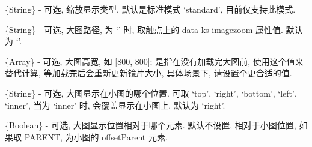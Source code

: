 \documentclass[letterpaper,10pt,english]{sphinxmanual}
\begin{document}
\begin{fulllineitems}
\label{api/component/imagezoom/index:ImageZoom.type}
\{String\} - 可选, 缩放显示类型, 默认是标准模式 `standard', 目前仅支持此模式.

\end{fulllineitems}



\begin{fulllineitems}
\label{api/component/imagezoom/index:ImageZoom.bigImageSrc}
\{String\} - 可选, 大图路径, 为 `' 时, 取触点上的 data-ks-imagezoom 属性值. 默认为 `'.

\end{fulllineitems}



\begin{fulllineitems}
\label{api/component/imagezoom/index:ImageZoom.bigImageSize}
\{Array\} - 可选, 大图高宽, 如 {[}800, 800{]}; 是指在没有加载完大图前, 使用这个值来替代计算, 等加载完后会重新更新镜片大小, 具体场景下, 请设置个更合适的值.

\end{fulllineitems}



\begin{fulllineitems}
\label{api/component/imagezoom/index:ImageZoom.position}
\{String\} - 可选, 大图显示在小图的哪个位置. 可取 `top', `right', `bottom', `left', `inner', 当为 `inner' 时, 会覆盖显示在小图上. 默认为 `right'.

\end{fulllineitems}



\begin{fulllineitems}
\label{api/component/imagezoom/index:ImageZoom.alignTo}
\{Boolean\} - 可选, 大图显示位置相对于哪个元素. 默认不设置, 相对于小图位置, 如果取 PARENT, 为小图的 offsetParent 元素.

\end{fulllineitems}


\end{document}
